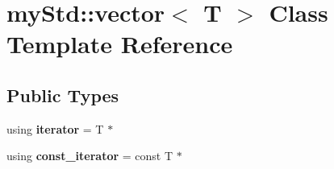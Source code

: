 \section{my\+Std\+:\+:vector$<$ T $>$ Class Template Reference}
\label{classmy_std_1_1vector}
\subsection*{Public Types}
\begin{DoxyCompactItemize}
\item 
\mbox{\label{classmy_std_1_1vector_ab04fd4dde7dab6739116b77e1ca41518}} 
using {\bfseries iterator} = T $\ast$
\item 
\mbox{\label{classmy_std_1_1vector_a6709caa152469f3215dbad750808b234}} 
using {\bfseries const\+\_\+iterator} = const T $\ast$
\end{DoxyCompactItemize}
